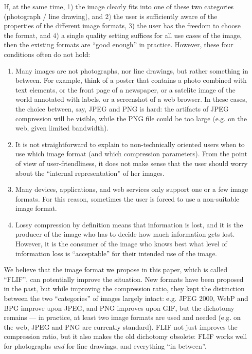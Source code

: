 \documentclass[a4paper,USenglish]{lipics}
\begin{document}
If, at the same time, 1) the image clearly fits into one of these two categories (photograph / line drawing), and 2) the user is
sufficiently aware of the properties of the different image formats, 3) the user has the freedom to choose the format,
and 4) a single quality setting suffices for all use cases of the image,
then the existing formats are ``good enough'' in practice. However, these four conditions often do not hold:
\begin{enumerate}
\item Many images are not photographs, nor line drawings, but rather something in between. For example, think of a poster that
contains a photo combined with text elements, or the front page of a newspaper, or a satelite image of the world annotated with labels,
or a screenshot of a web browser. In these cases, the choice between, say, JPEG and PNG is hard: the artifacts of JPEG compression will
be visible, while the PNG file could be too large (e.g. on the web, given limited bandwidth).

\item It is not straightforward to explain to non-technically oriented users when to use which image format (and which compression parameters).
From the point of view of user-friendliness, it does not make sense that the user should worry about the ``internal representation'' of her images.

\item Many devices, applications, and web services only support one or a few image formats. For this reason, sometimes the user is forced
to use a non-suitable image format.

\item Lossy compression by definition means that information is lost, and it is the producer of the image who has to decide how much information
gets lost. However, it is the consumer of the image who knows best what level of information loss is ``acceptable'' for their intended
use of the image.
\end{enumerate}

We believe that the image format we propose in this paper, which is called ``FLIF'', can potentially improve the situation.
New formats have been proposed in the past, but while improving the compression ratio, they kept the distinction between the
two ``categories'' of images largely intact: e.g. JPEG 2000, WebP and BPG improve upon JPEG, and PNG improves upon GIF, but the dichotomy remains
--- in practice, at least two image formats are used and needed (e.g. on the web, JPEG and PNG are currently standard).
FLIF not just improves the compression ratio, but it also makes the old dichotomy obsolete:
FLIF works well for photographs {\em and} for line drawings, and everything ``in between''.
\end{document}
